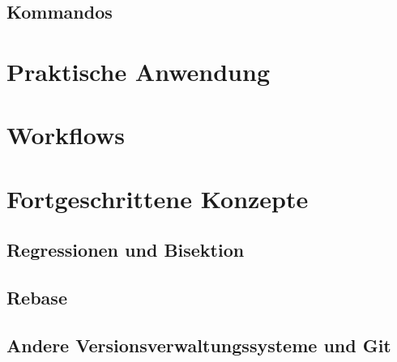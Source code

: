 \subsection{Kommandos}
\label{sec:Kommandos}
\section{Praktische Anwendung}
\label{sec:Praxis}
\section{Workflows}
\label{sec:Workflows}
\section{Fortgeschrittene Konzepte}
\label{sec:FortgeschritteneKonzepte}
\subsection{Regressionen und Bisektion}
\label{sec:Regressionen}
\subsection{Rebase}
\label{sec:Rebase}
\subsection{Andere Versionsverwaltungssysteme und Git}
\label{sec:AndereVersionsverwaltungssystemeundGit}
